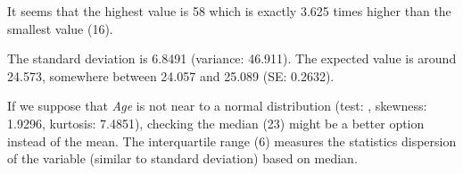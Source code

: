 \documentclass{article}
\begin{document}
It seems that the highest value is 58 which is exactly 3.625 times
higher than the smallest value (16).

The standard deviation is 6.8491 (variance: 46.911). The expected value
is around 24.573, somewhere between 24.057 and 25.089 (SE: 0.2632).

If we suppose that \emph{Age} is not near to a normal distribution
(test: , skewness: 1.9296, kurtosis: 7.4851), checking the median (23)
might be a better option instead of the mean. The interquartile range
(6) measures the statistics dispersion of the variable (similar to
standard deviation) based on median.
\end{document}
